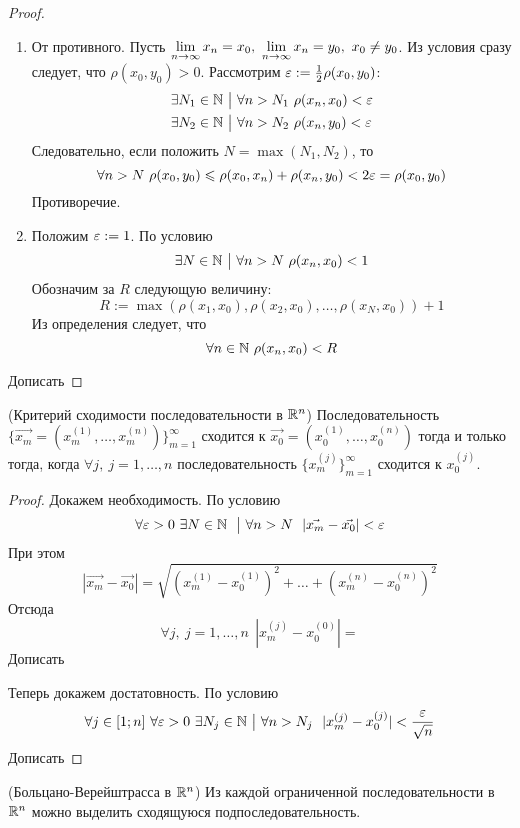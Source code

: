 \begin{proof}~
	\begin{enumerate}
		\item От противного. Пусть $\lim\limits_{n \to \infty} x_n = x_0,\ \lim\limits_{n \to \infty} x_n = y_0,\ x_0 \neq y_0$. Из условия сразу следует, что $\rho(x_0, y_0) > 0$. Рассмотрим $\varepsilon := \frac{1}{2}\rho(x_0, y_0)$:
		\begin{align*}
			&\exists N_1 \in \mathbb{N} \ \big|\  \forall n > N_1\ \rho(x_n, x_0) < \varepsilon
			\\
			&\exists N_2 \in \mathbb{N} \ \big|\  \forall n > N_2\ \rho(x_n, y_0) < \varepsilon
		\end{align*}
		Следовательно, если положить $N = \max(N_1, N_2)$, то
		\[
			\forall n > N\ \rho(x_0, y_0) \leqslant \rho(x_0, x_n) + \rho(x_n, y_0) < 2\varepsilon = \rho(x_0, y_0)
		\]
		Противоречие.
		
		\item Положим $\varepsilon := 1$. По условию
		\[
			\exists N \in \N \such \forall n > N\ \rho(x_n, x_0) < 1
		\]
		Обозначим за $R$ следующую величину:
		\[
			R := \max(\rho(x_1, x_0), \rho(x_2, x_0), \ldots, \rho(x_N, x_0)) + 1
		\]
		Из определения следует, что
		\[
			\forall n \in \mathbb{N}\ \rho(x_n, x_0) < R
		\]
	\end{enumerate}
	Дописать
\end{proof}

\begin{lemma} (Критерий сходимости последовательности в $\mathbb{R}^n$)
	Последовательность $\{\vec{x_m} = (x_m^{(1)}, \ldots, x_m^{(n)})\}_{m = 1}^\infty$ сходится к $\vec{x_0} = (x_0^{(1)}, \ldots, x_0^{(n)})$ тогда и только тогда, когда $\forall j,\ j = 1, \ldots, n$ последовательность $\{x_m^{(j)}\}_{m = 1}^\infty$ сходится к $x_0^{(j)}$.
\end{lemma}

\begin{proof}
	Докажем необходимость. По условию
	\[
		\forall \varepsilon > 0\ \exists N \in \mathbb{N}\ \ \big|\  \forall n > N\ \ |\vec{x_m} - \vec{x_0}| < \varepsilon
	\]
	При этом
	\[
		|\vec{x_m} - \vec{x_0}| = \sqrt{(x_m^{(1)} - x_0^{(1)})^2 + \ldots + (x_m^{(n)} - x_0^{(n)})^2}
	\]
	Отсюда
	\[
		\forall j,\ j = 1, \ldots, n\ \ |x_m^{(j)} - x_0^{(0)}| = 
	\]
	Дописать
	
	Теперь докажем достатовность. По условию
	\[
		\forall j \in [1; n]\ \forall \eps > 0\ \exists N_j \in \N \such \forall n > N_j\ \ |x_m^{(j)} - x_0^{(j)}| < \frac{\eps}{\sqrt{n}}
	\]
	Дописать
\end{proof}

\begin{theorem} (Больцано-Верейштрасса в $\mathbb{R}^n$)
	Из каждой ограниченной последовательности в $\mathbb{R}^n$ можно выделить сходящуюся подпоследовательность.
\end{theorem}


